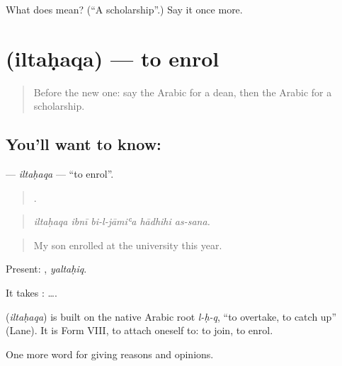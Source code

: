 \begin{tcolorbox}[breakable,colback=teal!4,colframe=teal!35!black,title={Before you move on}]
What does  mean? (\textquotedblleft{}A scholarship\textquotedblright{}.) Say it once more.
\end{tcolorbox}
\section[\texorpdfstring{\ar{التحق} (iltaḥaqa)}{التحق (iltaḥaqa)}]{ (iltaḥaqa) — to enrol}

\label{lesson:AR-C390-iltahaqa}



\begin{quote}
Before the new one: say the Arabic for a dean, then the Arabic for a scholarship.
\end{quote}

\subsection*{You'll want to know: }
\textbf{} — \emph{iltaḥaqa} — \textquotedblleft{}to enrol\textquotedblright{}.

\begin{quote}
    .
\end{quote}

\begin{quote}
\emph{iltaḥaqa ibnī bi-l-jāmiʿa hādhihi as-sana.}
\end{quote}

\begin{quote}
My son enrolled at the university this year.
\end{quote}

Present: , \emph{yaltaḥiq}.

It takes :   ….

\begin{cousinweb}
\textbf{} (\emph{iltaḥaqa}) is built on the native Arabic root \emph{l-ḥ-q}, \textquotedblleft{}to overtake, to catch up\textquotedblright{} (Lane). It is Form VIII, to attach oneself to: to join, to enrol.
\end{cousinweb}

\begin{grammarlens}[title={What you've built}]
One more word for giving reasons and opinions.
\end{grammarlens}

